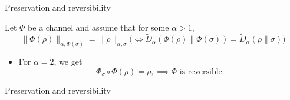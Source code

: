 \documentclass[mathserif]{beamer}
\newcommand{\<}{\langle}
\renewcommand{\>}{\rangle}
\begin{document}
\begin{frame}{Preservation and reversibility}

Let $\Phi$ be a channel and assume that for some $\alpha>1$,
\[
\|\Phi(\rho)\|_{\alpha,\Phi(\sigma)}=\|\rho\|_{\alpha,\sigma}\biggl(\iff \tilde
D_\alpha(\Phi(\rho)\|\Phi(\sigma))=\tilde D_\alpha(\rho\|\sigma)\biggr)
\]

\begin{itemize}
\item For $\alpha=2$, we get 
\[
\Phi_\sigma\circ\Phi(\rho)=\rho, \implies \Phi\text{ is
reversible.}
\]
\end{itemize}


\end{frame}


\begin{frame}{Preservation and reversibility}


\end{frame}
\end{document}
